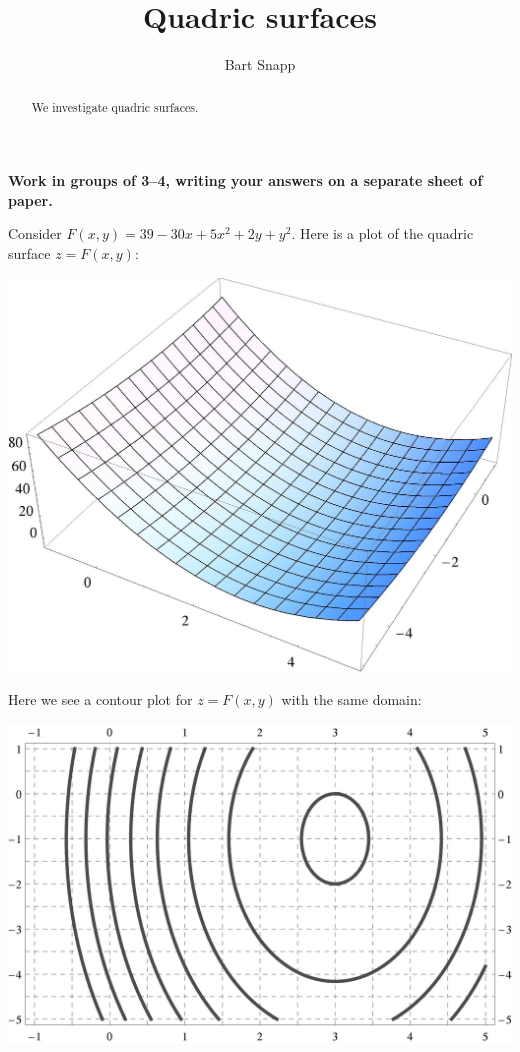 \documentclass[handout,noauthor,nooutcomes]{ximera}
\author{Bart Snapp}
\title[Collaborate:]{Quadric surfaces}
\begin{document}
\begin{abstract}
  We investigate quadric surfaces.
\end{abstract}
\maketitle

\textbf{Work in groups of 3--4, writing your answers on a separate
  sheet of paper.}


Consider $F(x,y)= 39 - 30 x + 5 x^2 + 2 y + y^2$. Here is a plot of
the quadric surface $z=F(x,y)$:
\begin{image}[3in]
  \includegraphics{surfacePlot1.jpg}
\end{image}
Here we see a contour plot for $z = F(x,y)$ with the same domain:
\begin{image}[4in]
  \includegraphics{contours1.jpg}
\end{image}
\end{document}
